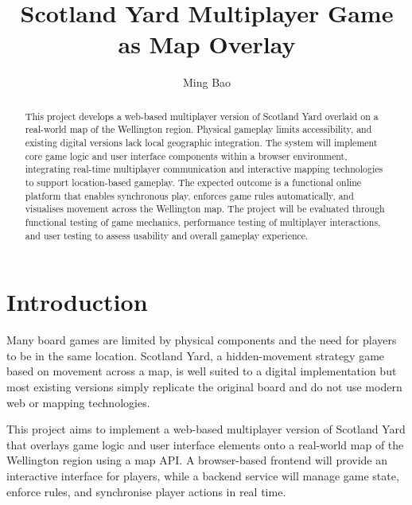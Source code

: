 \documentclass[11pt, a4paper, twoside, openright]{article}
\title{Scotland Yard Multiplayer Game as Map Overlay}
\author{Ming Bao}
\date{}
\begin{document}
	
	\frontmatter
	
	
	\begin{abstract}
		This project develops a web-based multiplayer version of Scotland Yard overlaid on a real-world map of the Wellington region. Physical gameplay limits accessibility, and existing digital versions lack local geographic integration. The system will implement core game logic and user interface components within a browser environment, integrating real-time multiplayer communication and interactive mapping technologies to support location-based gameplay. The expected outcome is a functional online platform that enables synchronous play, enforces game rules automatically, and visualises movement across the Wellington map. The project will be evaluated through functional testing of game mechanics, performance testing of multiplayer interactions, and user testing to assess usability and overall gameplay experience.
	\end{abstract}
	
	\maketitle
	
	
	
	\mainmatter
	
	
	
	\section{Introduction}
	
	Many board games are limited by physical components and the need for players to be in the same location. Scotland Yard, a hidden-movement strategy game based on movement across a map, is well suited to a digital implementation but most existing versions simply replicate the original board and do not use modern web or mapping technologies.
	
	This project aims to implement a web-based multiplayer version of Scotland Yard that overlays game logic and user interface elements onto a real-world map of the Wellington region using a map API. A browser-based frontend will provide an interactive interface for players, while a backend service will manage game state, enforce rules, and synchronise player actions in real time.
	
\end{document}
